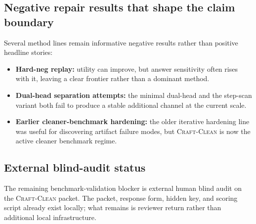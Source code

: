 \subsection{Negative repair results that shape the claim boundary}

Several method lines remain informative negative results rather than positive
headline stories:
\begin{itemize}[leftmargin=1.5em]
\item \textbf{Hard-neg replay:} utility can improve, but answer sensitivity
often rises with it, leaving a clear frontier rather than a dominant method.
\item \textbf{Dual-head separation attempts:} the minimal dual-head and the
step-scan variant both fail to produce a stable additional channel at the
current scale.
\item \textbf{Earlier cleaner-benchmark hardening:} the older iterative
hardening line was useful for discovering artifact failure modes, but
\textsc{Craft-Clean} is now the active cleaner benchmark regime.
\end{itemize}

\subsection{External blind-audit status}

The remaining benchmark-validation blocker is external human blind audit on the
\textsc{Craft-Clean} packet. The packet, response form, hidden key, and scoring script
already exist locally; what remains is reviewer return rather than additional
local infrastructure.
